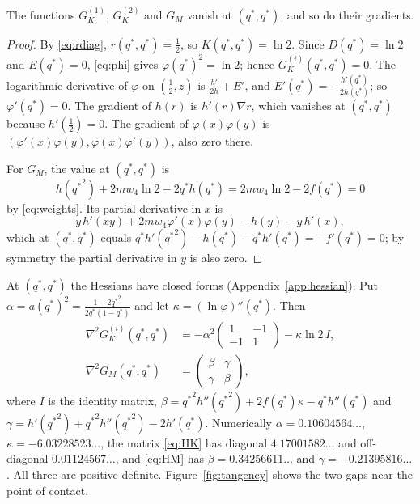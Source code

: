 \documentclass[12pt]{article}
\theoremstyle{plain}
\newcommand{\qs}{q^{*}}
\begin{document}
\begin{proposition}\label{prop:tangent}
The functions $G_K^{(1)}$, $G_K^{(2)}$ and $G_M$ vanish at $(\qs,\qs)$, and so do their gradients.
\end{proposition}

\begin{proof}
By \eqref{eq:rdiag}, $r(\qs,\qs)=\frac12$, so $K(\qs,\qs)=\ln 2$. Since $D(\qs)=\ln 2$ and $E(\qs)=0$, \eqref{eq:phi} gives $\varphi(\qs)^2=\ln 2$; hence $G_K^{(i)}(\qs,\qs)=0$. The logarithmic derivative of $\varphi$ on $(\frac12,z)$ is $\frac{h'}{2h}+E'$, and $E'(\qs)=-\frac{h'(\qs)}{2h(\qs)}$; so $\varphi'(\qs)=0$. The gradient of $h(r)$ is $h'(r)\nabla r$, which vanishes at $(\qs,\qs)$ because $h'(\frac12)=0$. The gradient of $\varphi(x)\varphi(y)$ is $(\varphi'(x)\varphi(y),\varphi(x)\varphi'(y))$, also zero there.

For $G_M$, the value at $(\qs,\qs)$ is
\[
h({\qs}^2)+2mw_4\ln2-2\qs h(\qs)=2mw_4\ln 2-2f(\qs)=0
\]
by \eqref{eq:weights}. Its partial derivative in $x$ is
\[
y\,h'(xy)+2mw_4\varphi'(x)\varphi(y)-h(y)-y\,h'(x),
\]
which at $(\qs,\qs)$ equals $\qs h'({\qs}^2)-h(\qs)-\qs h'(\qs)=-f'(\qs)=0$; by symmetry the partial derivative in $y$ is also zero.
\end{proof}

At $(\qs,\qs)$ the Hessians have closed forms (Appendix~\ref{app:hessian}). Put $\alpha=a(\qs)^2=\frac{1-2{\qs}^2}{2\qs(1-\qs)}$ and let $\kappa=(\ln\varphi)''(\qs)$. Then
\begin{align}
\nabla^2G_K^{(i)}(\qs,\qs)&=-\alpha^2\begin{pmatrix}1&-1\\-1&1\end{pmatrix}-\kappa\ln 2\,I,\label{eq:HK}\\
\nabla^2G_M(\qs,\qs)&=\begin{pmatrix}\beta&\gamma\\ \gamma&\beta\end{pmatrix},\label{eq:HM}
\end{align}
where $I$ is the identity matrix, $\beta={\qs}^2h''({\qs}^2)+2f(\qs)\kappa-\qs h''(\qs)$ and $\gamma=h'({\qs}^2)+{\qs}^2h''({\qs}^2)-2h'(\qs)$. Numerically $\alpha=0.10604564\ldots$, $\kappa=-6.03228523\ldots$, the matrix \eqref{eq:HK} has diagonal $4.17001582\ldots$ and off-diagonal $0.01124567\ldots$, and \eqref{eq:HM} has $\beta=0.34256611\ldots$ and $\gamma=-0.21395816\ldots$. All three are positive definite. Figure~\ref{fig:tangency} shows the two gaps near the point of contact.
\end{document}
